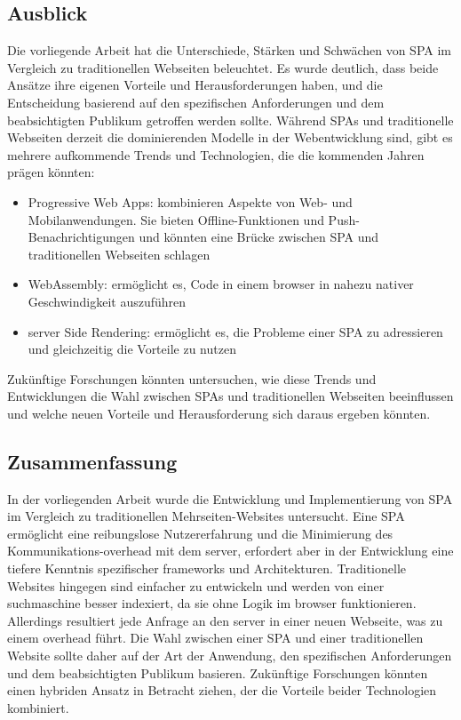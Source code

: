 \subsection{Ausblick}
Die vorliegende Arbeit hat die Unterschiede, Stärken und Schwächen von \ac{SPA} im Vergleich zu traditionellen Webseiten beleuchtet.
Es wurde deutlich, dass beide Ansätze ihre eigenen Vorteile und Herausforderungen haben, und die Entscheidung basierend auf den spezifischen Anforderungen und dem beabsichtigten Publikum getroffen werden sollte.
Während SPAs und traditionelle Webseiten derzeit die dominierenden Modelle in der Webentwicklung sind, gibt es mehrere aufkommende Trends und Technologien, die die kommenden Jahren prägen könnten:

\begin{itemize}
    \item Progressive Web Apps: kombinieren Aspekte von Web- und Mobilanwendungen. Sie bieten Offline-Funktionen und Push-Benachrichtigungen und könnten eine Brücke zwischen \ac{SPA} und traditionellen Webseiten schlagen
    \item WebAssembly: ermöglicht es, Code in einem \gls{browser} in nahezu nativer Geschwindigkeit auszuführen
    \item \gls{server} Side Rendering: ermöglicht es, die Probleme einer \ac{SPA} zu adressieren und gleichzeitig die Vorteile zu nutzen
\end{itemize}

Zukünftige Forschungen könnten untersuchen, wie diese Trends und Entwicklungen die Wahl zwischen \ac{SPA}s und traditionellen Webseiten beeinflussen und welche neuen Vorteile und Herausforderung sich daraus ergeben könnten.

\subsection{Zusammenfassung}
In der vorliegenden Arbeit wurde die Entwicklung und Implementierung von \ac{SPA} im Vergleich zu traditionellen Mehrseiten-Websites untersucht.
Eine \ac{SPA} ermöglicht eine reibungslose Nutzererfahrung und die Minimierung des Kommunikations-\gls{overhead} mit dem \gls{server}, erfordert aber in der Entwicklung eine tiefere Kenntnis spezifischer \gls{framework}s und Architekturen.
Traditionelle Websites hingegen sind einfacher zu entwickeln und werden von einer \gls{suchmaschine} besser indexiert, da sie ohne Logik im \gls{browser} funktionieren.
Allerdings resultiert jede Anfrage an den \gls{server} in einer neuen Webseite, was zu einem \gls{overhead} führt.
Die Wahl zwischen einer \ac{SPA} und einer traditionellen Website sollte daher auf der Art der Anwendung, den spezifischen Anforderungen und dem beabsichtigten Publikum basieren.
Zukünftige Forschungen könnten einen hybriden Ansatz in Betracht ziehen, der die Vorteile beider Technologien kombiniert.